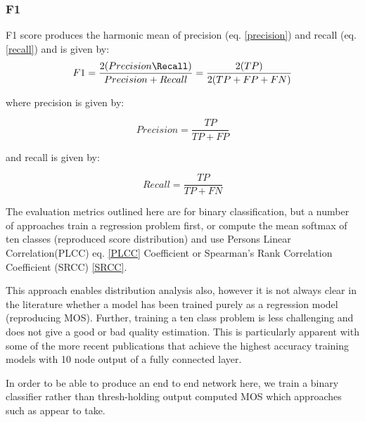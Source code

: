 \subsubsection{F1}

F1 score produces the harmonic mean of precision (eq. \ref{precision}) and recall (eq. \ref{recall}) and is given by: 
\begin{equation}
   F1 = \frac{2(Precision \Recall)}{Precision+Recall} = \frac{2(TP)}{2(TP+FP+FN)} 
\end{equation}

where precision is given by:

\begin{equation}
    Precision = \frac{TP}{TP+FP}
\label{precision}
\end{equation}


and recall is given by:

\begin{equation}
Recall = \frac{TP}{TP+FN}
\label{recall} 
\end{equation}

The evaluation metrics outlined here are for binary classification, but a number of approaches train a regression problem first, or compute the mean softmax of ten classes (reproduced score distribution) and use Persons Linear Correlation(PLCC) eq. \ref{PLCC} Coefficient or Spearman's Rank Correlation Coefficient (SRCC) \ref{SRCC}. 

This approach enables distribution analysis also, however it is not always clear in the literature whether a model has been trained purely as a regression model (reproducing MOS). Further, training a ten class problem is less challenging and does not give a good or bad quality estimation. This is particularly apparent with some of the more recent publications that achieve the highest accuracy training models with 10 node output of a fully connected layer. 

In order to be able to produce an end to end network here, we train a binary classifier rather than thresh-holding output computed MOS which approaches such as \cite{Talebi2018,Zhang2021d} appear to take. 



